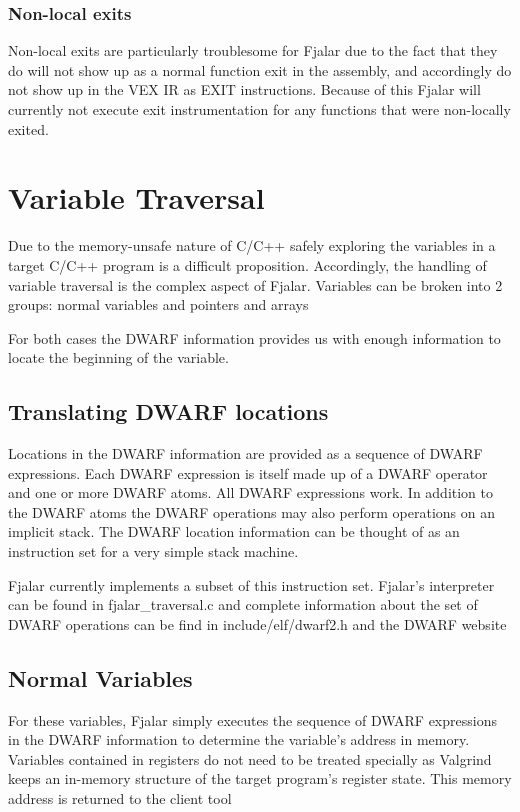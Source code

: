 \documentclass[11pt]{article}
\begin{document}
\subsubsection{Non-local exits}
Non-local exits are particularly troublesome for Fjalar due to the
fact that they do will not show up as a normal function exit in the
assembly, and accordingly do not show up in the VEX IR as EXIT
instructions. Because of this Fjalar will currently not execute exit
instrumentation for any functions that were non-locally exited.

\section{Variable Traversal}
Due to the memory-unsafe nature of C/C++ safely exploring the
variables in a target C/C++ program is a difficult
proposition. Accordingly, the handling of variable traversal is the
complex aspect of Fjalar. Variables can be broken into 2 groups:
normal variables %
and pointers and arrays

For both cases the DWARF information provides us with enough
information to locate the beginning of the variable.

\subsection{Translating DWARF locations}
Locations in the DWARF information are provided as a sequence of
DWARF expressions. Each DWARF expression is itself made up of a DWARF
operator and one or more DWARF atoms. All DWARF expressions work. In
addition to the DWARF atoms the DWARF operations may also perform
operations on an implicit stack. The DWARF location information can be
thought of as an instruction set for a very simple stack machine.

Fjalar currently implements a subset of this instruction set. Fjalar's
interpreter can be found in fjalar\_traversal.c and complete
information about the set of DWARF operations can be find in
include/elf/dwarf2.h and the DWARF website %

\subsection{Normal Variables} %
For these variables, Fjalar simply executes the sequence of DWARF
expressions in the DWARF information to determine the variable's
address in memory. Variables contained in registers do not need to be treated
specially as Valgrind keeps an in-memory structure of the target
program's register state. This memory address is returned to the
client tool
\end{document}
